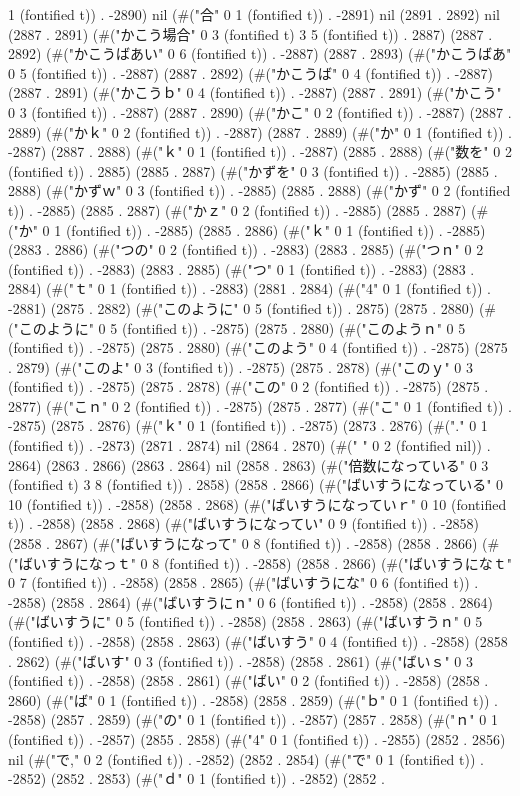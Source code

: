 1 (fontified t)) . -2890) nil (#("合" 0 1 (fontified t)) . -2891) nil (2891 . 2892) nil (2887 . 2891) (#("かこう場合" 0 3 (fontified t) 3 5 (fontified t)) . 2887) (2887 . 2892) (#("かこうばあい" 0 6 (fontified t)) . -2887) (2887 . 2893) (#("かこうばあ" 0 5 (fontified t)) . -2887) (2887 . 2892) (#("かこうば" 0 4 (fontified t)) . -2887) (2887 . 2891) (#("かこうｂ" 0 4 (fontified t)) . -2887) (2887 . 2891) (#("かこう" 0 3 (fontified t)) . -2887) (2887 . 2890) (#("かこ" 0 2 (fontified t)) . -2887) (2887 . 2889) (#("かｋ" 0 2 (fontified t)) . -2887) (2887 . 2889) (#("か" 0 1 (fontified t)) . -2887) (2887 . 2888) (#("ｋ" 0 1 (fontified t)) . -2887) (2885 . 2888) (#("数を" 0 2 (fontified t)) . 2885) (2885 . 2887) (#("かずを" 0 3 (fontified t)) . -2885) (2885 . 2888) (#("かずｗ" 0 3 (fontified t)) . -2885) (2885 . 2888) (#("かず" 0 2 (fontified t)) . -2885) (2885 . 2887) (#("かｚ" 0 2 (fontified t)) . -2885) (2885 . 2887) (#("か" 0 1 (fontified t)) . -2885) (2885 . 2886) (#("ｋ" 0 1 (fontified t)) . -2885) (2883 . 2886) (#("つの" 0 2 (fontified t)) . -2883) (2883 . 2885) (#("つｎ" 0 2 (fontified t)) . -2883) (2883 . 2885) (#("つ" 0 1 (fontified t)) . -2883) (2883 . 2884) (#("ｔ" 0 1 (fontified t)) . -2883) (2881 . 2884) (#("4" 0 1 (fontified t)) . -2881) (2875 . 2882) (#("このように" 0 5 (fontified t)) . 2875) (2875 . 2880) (#("このように" 0 5 (fontified t)) . -2875) (2875 . 2880) (#("このようｎ" 0 5 (fontified t)) . -2875) (2875 . 2880) (#("このよう" 0 4 (fontified t)) . -2875) (2875 . 2879) (#("このよ" 0 3 (fontified t)) . -2875) (2875 . 2878) (#("このｙ" 0 3 (fontified t)) . -2875) (2875 . 2878) (#("この" 0 2 (fontified t)) . -2875) (2875 . 2877) (#("こｎ" 0 2 (fontified t)) . -2875) (2875 . 2877) (#("こ" 0 1 (fontified t)) . -2875) (2875 . 2876) (#("ｋ" 0 1 (fontified t)) . -2875) (2873 . 2876) (#("." 0 1 (fontified t)) . -2873) (2871 . 2874) nil (2864 . 2870) (#("  " 0 2 (fontified nil)) . 2864) (2863 . 2866) (2863 . 2864) nil (2858 . 2863) (#("倍数になっている" 0 3 (fontified t) 3 8 (fontified t)) . 2858) (2858 . 2866) (#("ばいすうになっている" 0 10 (fontified t)) . -2858) (2858 . 2868) (#("ばいすうになっていｒ" 0 10 (fontified t)) . -2858) (2858 . 2868) (#("ばいすうになってい" 0 9 (fontified t)) . -2858) (2858 . 2867) (#("ばいすうになって" 0 8 (fontified t)) . -2858) (2858 . 2866) (#("ばいすうになっｔ" 0 8 (fontified t)) . -2858) (2858 . 2866) (#("ばいすうになｔ" 0 7 (fontified t)) . -2858) (2858 . 2865) (#("ばいすうにな" 0 6 (fontified t)) . -2858) (2858 . 2864) (#("ばいすうにｎ" 0 6 (fontified t)) . -2858) (2858 . 2864) (#("ばいすうに" 0 5 (fontified t)) . -2858) (2858 . 2863) (#("ばいすうｎ" 0 5 (fontified t)) . -2858) (2858 . 2863) (#("ばいすう" 0 4 (fontified t)) . -2858) (2858 . 2862) (#("ばいす" 0 3 (fontified t)) . -2858) (2858 . 2861) (#("ばいｓ" 0 3 (fontified t)) . -2858) (2858 . 2861) (#("ばい" 0 2 (fontified t)) . -2858) (2858 . 2860) (#("ば" 0 1 (fontified t)) . -2858) (2858 . 2859) (#("ｂ" 0 1 (fontified t)) . -2858) (2857 . 2859) (#("の" 0 1 (fontified t)) . -2857) (2857 . 2858) (#("ｎ" 0 1 (fontified t)) . -2857) (2855 . 2858) (#("4" 0 1 (fontified t)) . -2855) (2852 . 2856) nil (#("で," 0 2 (fontified t)) . -2852) (2852 . 2854) (#("で" 0 1 (fontified t)) . -2852) (2852 . 2853) (#("ｄ" 0 1 (fontified t)) . -2852) (2852 . 